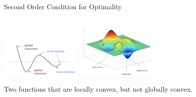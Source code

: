 \documentclass[11pt,compress,t,notes=noshow, xcolor=table]{beamer}
\begin{document}
\begin{vbframe}{Second Order Condition for Optimality}
  \begin{center}
  \includegraphics[width = 0.3\textwidth]{figure_man/local_global_min.png} \quad \includegraphics[width = 0.3\textwidth]{figure_man/local_global_min_2D.png} \\
  \vspace*{0.3cm}
  \begin{tiny}
    Two functions that are locally convex, but not globally convex. %
  \end{tiny}
  \end{center}
  
  


  
  




\end{vbframe}
\end{document}
